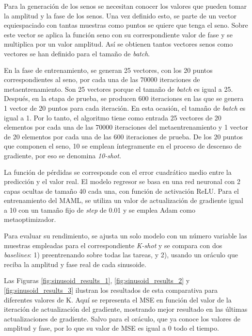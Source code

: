 Para la generación de los senos se necesitan conocer los valores que pueden tomar la amplitud y la fase de los senos. Una vez definido esto, se parte de un vector equiespaciado con tantas muestras como puntos se quiere que tenga el seno. Sobre este vector se aplica la función seno con su correspondiente valor de fase y se multiplica por un valor amplitud. Así se obtienen tantos vectores senos como vectores se han definido para el tamaño de \emph{batch}.

En la fase de entrenamiento, se generan 25 vectores, con los 20 puntos correspondientes al seno, por cada una de las 70000 iteraciones de metaentrenamiento. Son 25 vectores porque el tamaño de \emph{batch} es igual a 25. Después, en la etapa de prueba, se producen 600 iteraciones en las que se genera 1 vector de 20 puntos para cada iteración. En esta ocasión, el tamaño de \emph{batch} es igual a 1. Por lo tanto, el algoritmo tiene como entrada 25 vectores de 20 elementos por cada una de las 70000 iteraciones del metaentrenamiento y 1 vector de 20 elementos por cada una de las 600 iteraciones de prueba. De los 20 puntos que componen el seno, 10 se emplean íntegramente en el proceso de descenso de gradiente, por eso se denomina \emph{10-shot}. %


La función de pérdidas se corresponde con el error cuadrático medio entre la predicción y el valor real. El modelo regresor se basa en una red neuronal con 2 capas ocultas de tamaño 40 cada una, con función de activación ReLU. Para el entrenamiento del MAML, se utiliza un valor de actualización de gradiente igual a 10 con un tamaño fijo de \emph{step} de 0.01 y se emplea Adam como metaoptimizador.


Para evaluar su rendimiento, se ajusta un solo modelo con un número variable las muestras empleadas para el correspondiente \emph{K-shot} y se compara con dos \emph{baselines}: 1) preentrenando sobre todas las tareas, y 2), usando un oráculo que reciba la amplitud y fase real de cada sinusoide.

Las Figuras \ref{fig:sinusoid_results_1}, \ref{fig:sinusoid_results_2} y \ref{fig:sinusoid_results_3} ilustran los resultados de esta comparativa para diferentes valores de K. Aquí se representa el MSE en función del valor de la iteración de actualización del gradiente, mostrando mejor resultado en las últimas actualizaciones de gradiente. Salvo para el oráculo, que ya conoce los valores de amplitud y fase, por lo que su valor de MSE es igual a 0 todo el tiempo.

